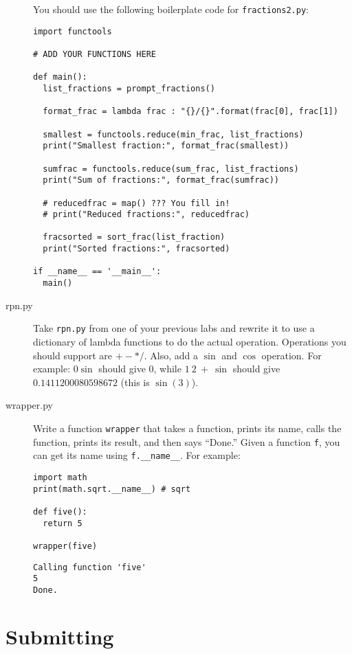 \documentclass[11pt]{cselabheader}
\begin{document}
\begin{description}
    You should use the following boilerplate code for \texttt{fractions2.py}:
    \begin{lstlisting}
import functools

# ADD YOUR FUNCTIONS HERE

def main():
  list_fractions = prompt_fractions()

  format_frac = lambda frac : "{}/{}".format(frac[0], frac[1])

  smallest = functools.reduce(min_frac, list_fractions)
  print("Smallest fraction:", format_frac(smallest))

  sumfrac = functools.reduce(sum_frac, list_fractions)
  print("Sum of fractions:", format_frac(sumfrac))

  # reducedfrac = map() ??? You fill in!
  # print("Reduced fractions:", reducedfrac)

  fracsorted = sort_frac(list_fraction)
  print("Sorted fractions:", fracsorted)

if __name__ == '__main__':
  main()
    \end{lstlisting}

  \item[rpn.py] Take \texttt{rpn.py} from one of your previous labs and rewrite
    it to use a dictionary of lambda functions to do the actual operation.
    Operations you should support are $+ - * /$. Also, add a $\sin$ and $\cos$
    operation. For example: $0 \sin$ should give $0$, while $1~2~+~\sin$ should
    give $0.1411200080598672$ (this is $\sin(3)$).

  \item[wrapper.py] Write a function \lstinline!wrapper! that takes a function,
    prints its name, calls the function, prints its result, and then says
    ``Done.'' Given a function \lstinline!f!, you can get its name using
    \lstinline!f.__name__!. For
    example:

    \begin{lstlisting}
import math
print(math.sqrt.__name__) # sqrt

def five():
  return 5

wrapper(five)
    \end{lstlisting}
    \begin{lstlisting}[style=bash]
Calling function 'five'
5
Done.
    \end{lstlisting}
\end{description}

\pagebreak
\section{Submitting}
\end{document}
